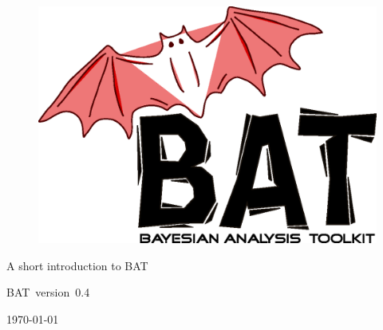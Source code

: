 \documentclass[11pt, a4paper]{article}
\newcommand{\bat}{{\sc BAT}}
\newcommand{\versionno}{0.4}
\newcommand{\version}{version~\versionno}
\begin{document}

\thispagestyle{empty}

\begin{figure}
\includegraphics[scale=0.25]{bat.eps}
\end{figure}

\vspace*{1cm}

\begin{center}


{\Large A short introduction to \bat}
\\

\vspace{1cm}

{\large \bat\ \version}

\end{center}

\thispagestyle{empty}

\vfill

\begin{center}
\today
\end{center}

\pagebreak


\thispagestyle{empty}

\enlargethispage{2cm}

\tableofcontents

\pagebreak

\end{document}
